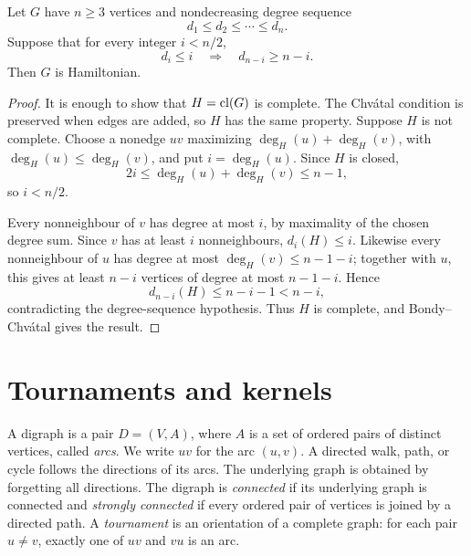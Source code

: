 \begin{notetheorem}
Let $G$ have $n\ge3$ vertices and nondecreasing degree sequence
\[
  d_1\le d_2\le\cdots\le d_n.
\]
Suppose that for every integer $i<n/2$,
\[
  d_i\le i\quad\Longrightarrow\quad d_{n-i}\ge n-i.
\]
Then $G$ is Hamiltonian.
\end{notetheorem}
\begin{proof}
It is enough to show that $H=\operatorname{cl}(G)$ is complete.  The Chv\'atal condition is preserved when edges are added, so $H$ has the same property.  Suppose $H$ is not complete.  Choose a nonedge $uv$ maximizing $\deg_H(u)+\deg_H(v)$, with $\deg_H(u)\le\deg_H(v)$, and put $i=\deg_H(u)$.  Since $H$ is closed,
\[
  2i\le\deg_H(u)+\deg_H(v)\le n-1,
\]
so $i<n/2$.

Every nonneighbour of $v$ has degree at most $i$, by maximality of the chosen degree sum.  Since $v$ has at least $i$ nonneighbours, $d_i(H)\le i$.  Likewise every nonneighbour of $u$ has degree at most $\deg_H(v)\le n-1-i$; together with $u$, this gives at least $n-i$ vertices of degree at most $n-1-i$.  Hence
\[
  d_{n-i}(H)\le n-i-1<n-i,
\]
contradicting the degree-sequence hypothesis.  Thus $H$ is complete, and Bondy--Chv\'atal gives the result.
\end{proof}
\section{Tournaments and kernels}

\begin{notedefinition}
A digraph is a pair $D=(V,A)$, where $A$ is a set of ordered pairs of distinct vertices, called \emph{arcs}.  We write $uv$ for the arc $(u,v)$.  A directed walk, path, or cycle follows the directions of its arcs.  The underlying graph is obtained by forgetting all directions.  The digraph is \emph{connected} if its underlying graph is connected and \emph{strongly connected} if every ordered pair of vertices is joined by a directed path.  A \emph{tournament} is an orientation of a complete graph: for each pair $u\ne v$, exactly one of $uv$ and $vu$ is an arc.
\end{notedefinition}

